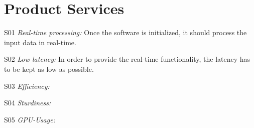 \section{Product Services}

\begin{aims}
	\item[S01] \textit{Real-time processing:} Once the software is initialized, it should process the input data in real-time.
	
	\item[S02] \textit{Low latency:} In order to provide the real-time functionality, the latency has to be kept as low as possible.
	
	\item[S03] \textit{Efficiency:} 
	
	\item[S04] \textit{Sturdiness:} 
	
	\item[S05] \textit{GPU-Usage:} 
\end{aims}